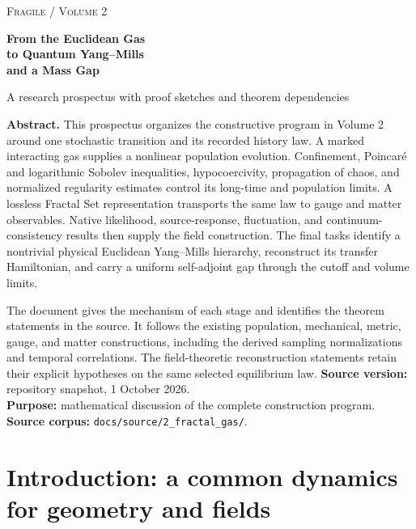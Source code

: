 \documentclass[11pt,a4paper]{article}
\begin{document}
\hypersetup{pageanchor=false}
\begin{titlepage}
\vspace*{18mm}
{\small\scshape Fragile / Volume 2}\par\vspace{12mm}
{\LARGE\bfseries\color{ink} From the Euclidean Gas\\[4pt] to Quantum Yang--Mills\\[4pt] and a Mass Gap}\par\vspace{8mm}
{\large A research prospectus with proof sketches and theorem dependencies}\par\vspace{13mm}
\textbf{Abstract.} This prospectus organizes the constructive program in Volume 2 around one stochastic transition and its recorded history law. A marked interacting gas supplies a nonlinear population evolution. Confinement, Poincar\'e and logarithmic Sobolev inequalities, hypocoercivity, propagation of chaos, and normalized regularity estimates control its long-time and population limits. A lossless Fractal Set representation transports the same law to gauge and matter observables. Native likelihood, source-response, fluctuation, and continuum-consistency results then supply the field construction. The final tasks identify a nontrivial physical Euclidean Yang--Mills hierarchy, reconstruct its transfer Hamiltonian, and carry a uniform self-adjoint gap through the cutoff and volume limits.

The document gives the mechanism of each stage and identifies the theorem statements in the source. It follows the existing population, mechanical, metric, gauge, and matter constructions, including the derived sampling normalizations and temporal correlations. The field-theoretic reconstruction statements retain their explicit hypotheses on the same selected equilibrium law.
\vfill
\textbf{Source version:} repository snapshot, 1 October 2026.\\
\textbf{Purpose:} mathematical discussion of the complete construction program.\\
\textbf{Source corpus:} \texttt{docs/source/2\_fractal\_gas/}.
\end{titlepage}
\hypersetup{pageanchor=true}
\begingroup\setlength{\parskip}{0pt}\footnotesize\tableofcontents\endgroup
\clearpage
{}

\section*{Introduction: a common dynamics for geometry and fields}
\label{sec:shared-dynamics}
\end{document}
